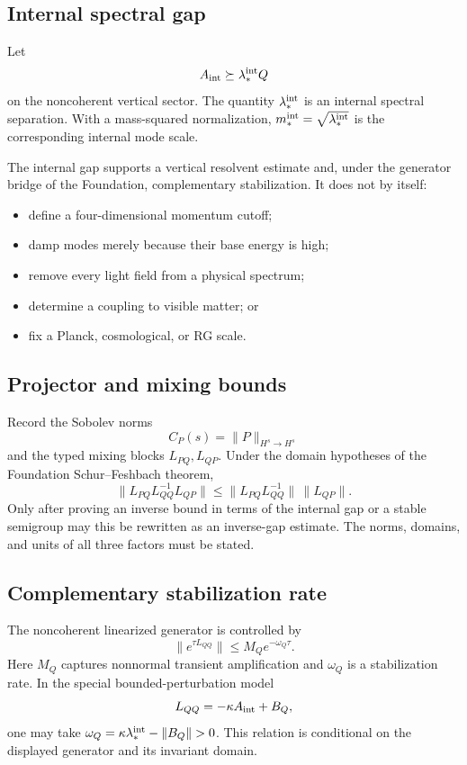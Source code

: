 \documentclass[11pt]{article}
\begin{document}
\subsection{Internal spectral gap}

Let
\[
 A_{\rm int}\succeq\lambda_\ast^{\rm int}Q
\]
on the noncoherent vertical sector. The quantity
$\lambda_\ast^{\rm int}$ is an internal spectral separation. With a
mass-squared normalization, $m_\ast^{\rm int}=\sqrt{\lambda_\ast^{\rm int}}$
is the corresponding internal mode scale.

The internal gap supports a vertical resolvent estimate and, under the
generator bridge of the Foundation, complementary stabilization. It does not
by itself:
\begin{itemize}
\item define a four-dimensional momentum cutoff;
\item damp modes merely because their base energy is high;
\item remove every light field from a physical spectrum;
\item determine a coupling to visible matter; or
\item fix a Planck, cosmological, or RG scale.
\end{itemize}

\subsection{Projector and mixing bounds}

Record the Sobolev norms
\[
 C_P(s)=\|P\|_{H^s\to H^s}
\]
and the typed mixing blocks $L_{PQ},L_{QP}$. Under the domain hypotheses of the
Foundation Schur--Feshbach theorem,
\[
 \|L_{PQ}L_{QQ}^{-1}L_{QP}\|
 \le
 \|L_{PQ}L_{QQ}^{-1}\|\,\|L_{QP}\|.
\]
Only after proving an inverse bound in terms of the internal gap or a stable
semigroup may this be rewritten as an inverse-gap estimate. The norms, domains,
and units of all three factors must be stated.

\subsection{Complementary stabilization rate}

The noncoherent linearized generator is controlled by
\[
 \|e^{\tau L_{QQ}}\|\le M_Qe^{-\omega_Q\tau}.
\]
Here $M_Q$ captures nonnormal transient amplification and $\omega_Q$ is a
stabilization rate. In the special bounded-perturbation model
\[
 L_{QQ}=-\kappa A_{\rm int}+B_Q,
\]
one may take
$\omega_Q=\kappa\lambda_\ast^{\rm int}-\|B_Q\|>0$.
This relation is conditional on the displayed generator and its invariant
domain.
\end{document}
